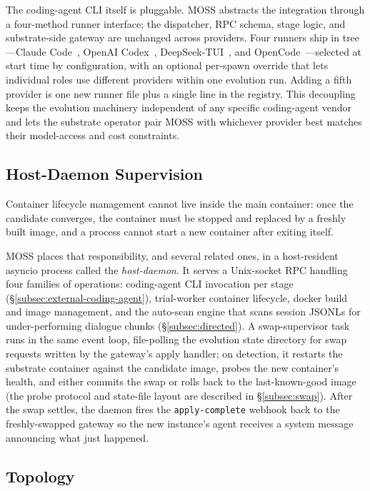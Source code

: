 The coding-agent CLI itself is pluggable. MOSS abstracts the integration through a four-method runner interface; the dispatcher, RPC schema, stage logic, and substrate-side gateway are unchanged across providers. Four runners ship in tree---Claude Code~\citep{claude-code}, OpenAI Codex~\citep{openai-codex-cli}, DeepSeek-TUI~\citep{deepseek-tui}, and OpenCode~\citep{opencode}---selected at start time by configuration, with an optional per-spawn override that lets individual roles use different providers within one evolution run. Adding a fifth provider is one new runner file plus a single line in the registry. This decoupling keeps the evolution machinery independent of any specific coding-agent vendor and lets the substrate operator pair MOSS with whichever provider best matches their model-access and cost constraints.

\subsection{Host-Daemon Supervision}
\label{subsec:host-daemon}

Container lifecycle management cannot live inside the main container: once the candidate converges, the container must be stopped and replaced by a freshly built image, and a process cannot start a new container after exiting itself.

MOSS places that responsibility, and several related ones, in a host-resident asyncio process called the \emph{host-daemon}. It serves a Unix-socket RPC handling four families of operations: coding-agent CLI invocation per stage (\S\ref{subsec:external-coding-agent}), trial-worker container lifecycle, docker build and image management, and the auto-scan engine that scans session JSONLs for under-performing dialogue chunks (\S\ref{subsec:directed}). A swap-supervisor task runs in the same event loop, file-polling the evolution state directory for swap requests written by the gateway's apply handler; on detection, it restarts the substrate container against the candidate image, probes the new container's health, and either commits the swap or rolls back to the last-known-good image (the probe protocol and state-file layout are described in \S\ref{subsec:swap}). After the swap settles, the daemon fires the \texttt{apply-complete} webhook back to the freshly-swapped gateway so the new instance's agent receives a system message announcing what just happened.

\subsection{Topology}
\label{subsec:topology}

